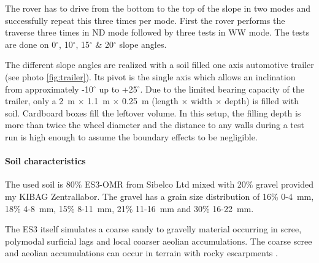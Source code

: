 \documentclass[a4paper,twocolumn]{esapub2005} %
\begin{document}
The rover has to drive from the bottom to the top
of the slope in two modes and successfully repeat this three times per mode.
First the rover performs the traverse three times in ND mode
followed by three tests in WW mode. The tests are done on
0$^{\circ}$, 10$^{\circ}$, 15$^{\circ}$ \& 20$^{\circ}$ slope angles. 

The different slope angles are realized with a soil filled one axis automotive trailer (see photo
\ref{fig:trailer}). Its pivot is the single axis which allows an inclination
from approximately -10$^{\circ}$ up to +25$^{\circ}$. Due to the limited
bearing capacity of the trailer, only a 2~\unit{m} $\times$ 1.1~\unit{m}
$\times$ 0.25~\unit{m} (length $\times$ width $\times$ depth) is filled with
soil. Cardboard boxes fill the leftover volume. In this setup, the filling
depth is more than twice the wheel diameter and the distance to any walls
during a test run is high enough to assume  the boundary effects to be
negligible.  

\paragraph{Soil characteristics} The used soil is 80\% ES3-OMR from Sibelco Ltd mixed with 20\%
gravel provided my KIBAG Zentrallabor. The gravel has a grain size distribution
of 16\% 0-4~\unit{mm}, 18\% 4-8~\unit{mm}, 15\% 8-11~\unit{mm}, 21\%
11-16~\unit{mm} and 30\% 16-22~\unit{mm}.  

The ES3 itself simulates a coarse sandy to gravelly material occurring in scree, polymodal surficial lags and local coarser aeolian accumulations. The coarse scree and aeolian accumulations can occur in terrain with rocky escarpments \cite{michaud2014}.



\end{document}
